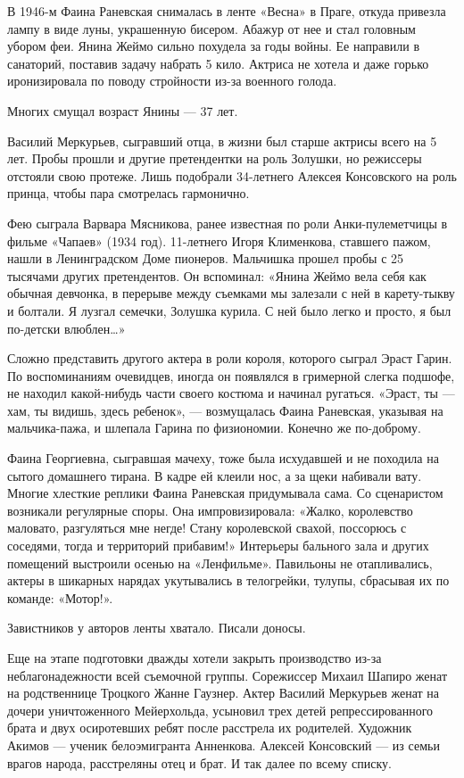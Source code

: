 В 1946-м Фаина Раневская снималась в ленте «Весна» в Праге, откуда привезла
лампу в виде луны, украшенную бисером. Абажур от нее и стал головным убором
феи.  Янина Жеймо сильно похудела за годы войны. Ее направили в санаторий,
поставив задачу набрать 5 кило. Актриса не хотела и даже горько иронизировала
по поводу стройности из-за военного голода.

Многих смущал возраст Янины — 37 лет.

Василий Меркурьев, сыгравший отца, в жизни был старше актрисы всего на 5 лет.
Пробы прошли и другие претендентки на роль Золушки, но режиссеры отстояли свою
протеже. Лишь подобрали 34-летнего Алексея Консовского на роль принца, чтобы
пара смотрелась гармонично.

Фею сыграла Варвара Мясникова, ранее известная по роли Анки-пулеметчицы в
фильме «Чапаев» (1934 год). 11-летнего Игоря Клименкова, ставшего пажом, нашли
в Ленинградском Доме пионеров. Мальчишка прошел пробы с 25 тысячами других
претендентов. Он вспоминал: «Янина Жеймо вела себя как обычная девчонка, в
перерыве между съемками мы залезали с ней в карету-тыкву и болтали. Я лузгал
семечки, Золушка курила. С ней было легко и просто, я был по-детски влюблен…»

Сложно представить другого актера в роли короля, которого сыграл Эраст Гарин.
По воспоминаниям очевидцев, иногда он появлялся в гримерной слегка подшофе, не
находил какой-нибудь части своего костюма и начинал ругаться. «Эраст, ты — хам,
ты видишь, здесь ребенок», — возмущалась Фаина Раневская, указывая на
мальчика-пажа, и шлепала Гарина по физиономии. Конечно же по-доброму.

Фаина Георгиевна, сыгравшая мачеху, тоже была исхудавшей и не походила на
сытого домашнего тирана. В кадре ей клеили нос, а за щеки набивали вату. Многие
хлесткие реплики Фаина Раневская придумывала сама. Со сценаристом возникали
регулярные споры. Она импровизировала: «Жалко, королевство маловато,
разгуляться мне негде! Стану королевской свахой, поссорюсь с соседями, тогда и
территорий прибавим!» Интерьеры бального зала и других помещений выстроили
осенью на «Ленфильме». Павильоны не отапливались, актеры в шикарных нарядах
укутывались в телогрейки, тулупы, сбрасывая их по команде: «Мотор!».

Завистников у авторов ленты хватало. Писали доносы.

Еще на этапе подготовки дважды хотели закрыть производство из-за
неблагонадежности всей съемочной группы. Сорежиссер Михаил Шапиро женат на
родственнице Троцкого Жанне Гаузнер. Актер Василий Меркурьев женат на дочери
уничтоженного Мейерхольда, усыновил трех детей репрессированного брата и двух
осиротевших ребят после расстрела их родителей. Художник Акимов — ученик
белоэмигранта Анненкова. Алексей Консовский — из семьи врагов народа,
расстреляны отец и брат. И так далее по всему списку.

